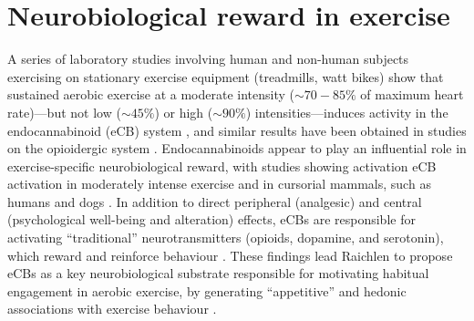 \section{Neurobiological reward in exercise\label{sect:neuroRewardGE}}
A series of laboratory studies involving human and non-human subjects exercising on stationary exercise equipment (treadmills, watt bikes) show that sustained aerobic exercise at a moderate intensity ($\sim70-85\%$ of maximum heart rate)---but not low ($\sim45\%$) or high ($\sim90\%$) intensities---induces activity in the endocannabinoid (eCB) system \citep{Raichlen2013}, and similar results have been obtained in studies on the opioidergic system \citep{Boecker2008}.  Endocannabinoids appear to play an influential role in exercise-specific neurobiological reward, with studies showing activation eCB activation in moderately intense exercise and in cursorial mammals, such as humans and dogs \citep[but not non-cursorial mammals, e.g., ferrets;][]{Raichlen2012}.  In addition to direct peripheral (analgesic) and central (psychological well-being and alteration) effects, eCBs are responsible for activating ``traditional'' neurotransmitters (opioids, dopamine, and serotonin), which reward and reinforce behaviour \citep{Sparling2003}.  These findings lead Raichlen to propose eCBs as a key neurobiological substrate responsible for motivating habitual engagement in aerobic exercise, by generating ``appetitive'' and hedonic associations with exercise behaviour \citep{Raichlen2012}.
